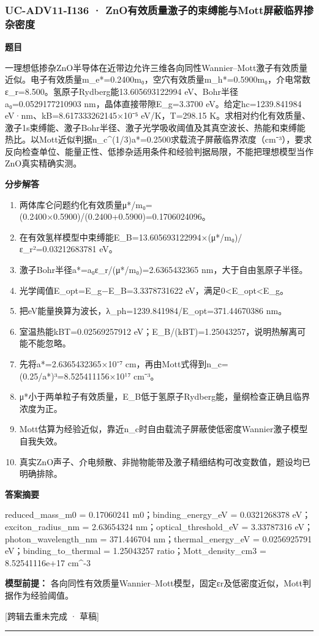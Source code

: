 \documentclass[UTF8,11pt,a4paper]{ctexart}
\begin{document}
\subsubsection*{UC-ADV11-I136 · ZnO有效质量激子的束缚能与Mott屏蔽临界掺杂密度}
\noindent\textbf{题目}\par
一理想低掺杂ZnO半导体在近带边允许三维各向同性Wannier–Mott激子有效质量近似。电子有效质量m\_e*=0.2400m₀，空穴有效质量m\_h*=0.5900m₀，介电常数ε\_r=8.500。氢原子Rydberg能13.605693122994 eV、Bohr半径a₀=0.0529177210903 nm，晶体直接带隙E\_g=3.3700 eV。给定hc=1239.841984 eV·nm、kB=8.617333262145×10⁻⁵ eV/K，T=298.15 K。求相对约化有效质量、激子1s束缚能、激子Bohr半径、激子光学吸收阈值及其真空波长、热能和束缚能热比。以Mott近似判据n\_c\textasciicircum{}(1/3)a*=0.2500求载流子屏蔽临界浓度（cm⁻³），要求反向检查单位、能量正性、低掺杂适用条件和经验判据局限，不能把理想模型当作ZnO真实精确实测。\par
\medskip\noindent\textbf{分步解答}
\begin{enumerate}
\item 两体库仑问题约化有效质量μ*/m₀=(0.2400×0.5900)/(0.2400+0.5900)=0.1706024096。
\item 在有效氢样模型中束缚能E\_B=13.605693122994×(μ*/m₀)/ε\_r²=0.03212683781 eV。
\item 激子Bohr半径a*=a₀ε\_r/(μ*/m₀)=2.6365432365 nm，大于自由氢原子半径。
\item 光学阈值E\_opt=E\_g−E\_B=3.3378731622 eV，满足0<E\_opt<E\_g。
\item 把eV能量换算为波长，λ\_ph=1239.841984/E\_opt=371.44670386 nm。
\item 室温热能kBT=0.02569257912 eV；E\_B/(kBT)=1.25043257，说明热解离可能不能忽略。
\item 先将a*=2.6365432365×10⁻⁷ cm，再由Mott式得到n\_c=(0.25/a*)³=8.525411156×10¹⁷ cm⁻³。
\item μ*小于两单粒子有效质量，E\_B低于氢原子Rydberg能，量纲检查正确且临界浓度为正。
\item Mott估算为经验近似，靠近n\_c时自由载流子屏蔽使低密度Wannier激子模型自我失效。
\item 真实ZnO声子、介电频散、非抛物能带及激子精细结构可改变数值，题设均已明确排除。
\end{enumerate}
\noindent\textbf{答案摘要}\par
reduced\_mass\_m0 = 0.17060241 m0；binding\_energy\_eV = 0.0321268378 eV；exciton\_radius\_nm = 2.63654324 nm；optical\_threshold\_eV = 3.33787316 eV；photon\_wavelength\_nm = 371.446704 nm；thermal\_energy\_eV = 0.0256925791 eV；binding\_to\_thermal = 1.25043257 ratio；Mott\_density\_cm3 = 8.52541116e+17 cm\textasciicircum{}-3\par
\noindent\textbf{模型前提：}
各向同性有效质量Wannier–Mott模型，固定εr及低密度近似，Mott判据作为经验阈值。\par
\noindent\textcolor{red!65!black}{[跨辑去重未完成 · 草稿]} \par
\medskip\hrule\medskip
{}
\end{document}
